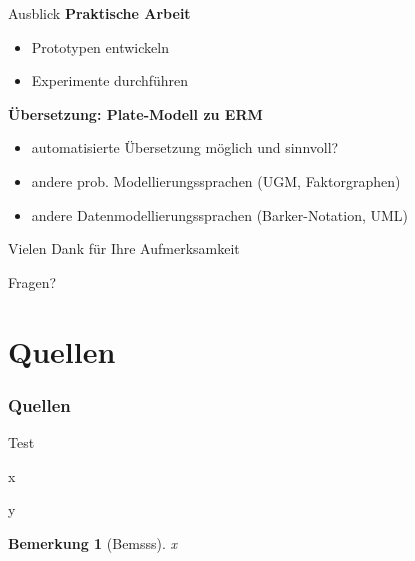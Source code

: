 \documentclass{beamer}
\newtheorem*{bem}{Bemerkung}
\begin{document}
\begin{frame}{Ausblick}
\textbf{Praktische Arbeit}
\begin{itemize}
\item Prototypen entwickeln
\item Experimente durchführen
\end{itemize}

\vspace*{2em}
\textbf{Übersetzung: Plate-Modell zu ERM}
\begin{itemize}
\item automatisierte Übersetzung möglich und sinnvoll?
\item andere prob. Modellierungssprachen (UGM, Faktorgraphen)
\item andere Datenmodellierungssprachen (Barker-Notation, UML)
\end{itemize}
\end{frame}

\begin{frame}
\thispagestyle{empty}
\begin{center}
\Huge Vielen Dank für Ihre Aufmerksamkeit

\vspace*{2em}
Fragen?
\end{center}
\end{frame}

\section*{Quellen}
\begin{frame}
\frametitle{Quellen}
\def\bibfont{\scriptsize}
\printbibliography
\end{frame}

\begin{frame}{Test}

x
\begin{definition}[Definition]
y
\end{definition}

\begin{bem}[Bemsss]
x
\end{bem}
\end{frame}
\end{document}
